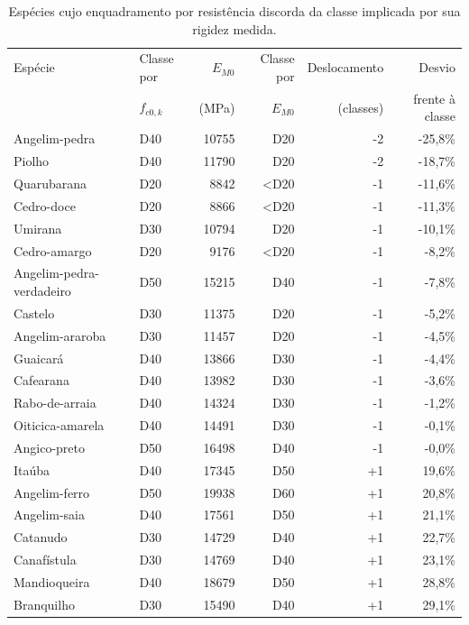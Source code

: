 \begin{table}[!ht]
\caption{Espécies cujo enquadramento por resistência discorda da classe implicada por sua rigidez medida.\label{tab:discordancia}}
\begin{threeparttable}
\begin{tabular*}{\columnwidth}{@{\extracolsep{\fill}}llrrrr@{\extracolsep{\fill}}}
\toprule
Espécie & Classe por & $E_{M0}$ & Classe por & Deslocamento & Desvio \\
 & $f_{c0,k}$ & (MPa) & $E_{M0}$ & (classes) & frente à classe \\
\midrule
Angelim-pedra & D40 & 10755 & D20 & -2 & -25,8\% \\
Piolho & D40 & 11790 & D20 & -2 & -18,7\% \\
Quarubarana & D20 & 8842 & <D20 & -1 & -11,6\% \\
Cedro-doce & D20 & 8866 & <D20 & -1 & -11,3\% \\
Umirana & D30 & 10794 & D20 & -1 & -10,1\% \\
Cedro-amargo & D20 & 9176 & <D20 & -1 & -8,2\% \\
Angelim-pedra-verdadeiro & D50 & 15215 & D40 & -1 & -7,8\% \\
Castelo & D30 & 11375 & D20 & -1 & -5,2\% \\
Angelim-araroba & D30 & 11457 & D20 & -1 & -4,5\% \\
Guaicará & D40 & 13866 & D30 & -1 & -4,4\% \\
Cafearana & D40 & 13982 & D30 & -1 & -3,6\% \\
Rabo-de-arraia & D40 & 14324 & D30 & -1 & -1,2\% \\
Oiticica-amarela & D40 & 14491 & D30 & -1 & -0,1\% \\
Angico-preto & D50 & 16498 & D40 & -1 & -0,0\% \\
Itaúba & D40 & 17345 & D50 & +1 & 19,6\% \\
Angelim-ferro & D50 & 19938 & D60 & +1 & 20,8\% \\
Angelim-saia & D40 & 17561 & D50 & +1 & 21,1\% \\
Catanudo & D30 & 14729 & D40 & +1 & 22,7\% \\
Canafístula & D30 & 14769 & D40 & +1 & 23,1\% \\
Mandioqueira & D40 & 18679 & D50 & +1 & 28,8\% \\
Branquilho & D30 & 15490 & D40 & +1 & 29,1\% \\

\end{tabular*}
\end{threeparttable}
\end{table}
